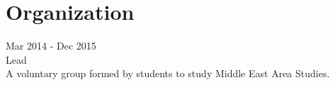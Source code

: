 \documentclass[10pt]{article} %
\begin{document}

\if{}
\section{Organization}

{
Mar 2014 - Dec 2015\\
Lead\\
A voluntary group formed by students to study Middle East Area Studies.
}

\fi

\end{document}
